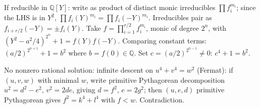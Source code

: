 \documentclass{article}
\begin{document}
If reducible in $\mathbb{Q}[Y]$: write as product of distinct monic irreducibles $\prod f_i^{m_i}$; since the LHS is in $Y^2$, $\prod f_i(Y)^{m_i} = \prod f_i(-Y)^{m_i}$. Irreducibles pair as $f_{i+r/2}(-Y) = \pm f_i(Y)$. Take $f = \prod_{i=1}^{r/2} f_i^{m_i}$, monic of degree $2^n$, with $(Y^2 - a^2/4)^{2^n} + 1 = f(Y) f(-Y)$. Comparing constant terms: $(a/2)^{2^{n+1}} + 1 = b^2$ where $b = f(0) \in \mathbb{Q}$. Set $c = (a/2)^{2^{n-1}} \ne 0$: $c^4 + 1 = b^2$.

No nonzero rational solution: infinite descent on $u^4 + v^4 = w^2$ (Fermat): if $(u, v, w)$ with minimal $w$, write primitive Pythagorean decomposition $u^2 = d^2 - e^2$, $v^2 = 2de$, giving $d = f^2$, $e = 2g^2$; then $(u, e, d)$ primitive Pythagorean gives $f^2 = k^4 + l^4$ with $f < w$. Contradiction.
\end{document}
